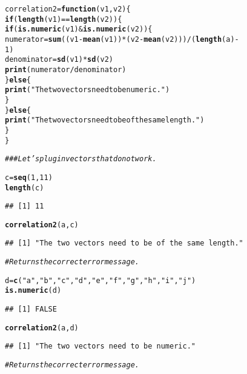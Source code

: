 \documentclass[12pt,letter]{article}\usepackage[]{graphicx}\usepackage[]{color}
\makeatletter
\newcommand{\hlnum}[1]{\textcolor[rgb]{0.686,0.059,0.569}{#1}}%
\newcommand{\hlstr}[1]{\textcolor[rgb]{0.192,0.494,0.8}{#1}}%
\newcommand{\hlcom}[1]{\textcolor[rgb]{0.678,0.584,0.686}{\textit{#1}}}%
\newcommand{\hlopt}[1]{\textcolor[rgb]{0,0,0}{#1}}%
\newcommand{\hlstd}[1]{\textcolor[rgb]{0.345,0.345,0.345}{#1}}%
\newcommand{\hlkwa}[1]{\textcolor[rgb]{0.161,0.373,0.58}{\textbf{#1}}}%
\newcommand{\hlkwb}[1]{\textcolor[rgb]{0.69,0.353,0.396}{#1}}%
\newcommand{\hlkwc}[1]{\textcolor[rgb]{0.333,0.667,0.333}{#1}}%
\newcommand{\hlkwd}[1]{\textcolor[rgb]{0.737,0.353,0.396}{\textbf{#1}}}%
\newenvironment{kframe}{%
 \def\at@end@of@kframe{}%
 \ifinner\ifhmode%
  \def\at@end@of@kframe{\end{minipage}}%
  \begin{minipage}{\columnwidth}%
 \fi\fi%
 \def\FrameCommand##1{\hskip\@totalleftmargin \hskip-\fboxsep
 \colorbox{shadecolor}{##1}\hskip-\fboxsep
     \hskip-\linewidth \hskip-\@totalleftmargin \hskip\columnwidth}%
 \MakeFramed {\advance\hsize-\width
   \@totalleftmargin\z@ \linewidth\hsize
   \@setminipage}}%
 {\par\unskip\endMakeFramed%
 \at@end@of@kframe}
\newenvironment{knitrout}{}{} %
\makeatother
\begin{document}
\begin{knitrout}
\begin{kframe}
\begin{alltt}
\hlstd{correlation2} \hlkwb{=} \hlkwa{function}\hlstd{(}\hlkwc{v1}\hlstd{,} \hlkwc{v2}\hlstd{) \{}
    \hlkwa{if} \hlstd{(}\hlkwd{length}\hlstd{(v1)} \hlopt{==} \hlkwd{length}\hlstd{(v2)) \{}
        \hlkwa{if} \hlstd{(}\hlkwd{is.numeric}\hlstd{(v1)} \hlopt{&} \hlkwd{is.numeric}\hlstd{(v2)) \{}
            \hlstd{numerator} \hlkwb{=} \hlkwd{sum}\hlstd{((v1} \hlopt{-} \hlkwd{mean}\hlstd{(v1))} \hlopt{*} \hlstd{(v2} \hlopt{-} \hlkwd{mean}\hlstd{(v2)))}\hlopt{/}\hlstd{(}\hlkwd{length}\hlstd{(a)} \hlopt{-}
                \hlnum{1}\hlstd{)}
            \hlstd{denominator} \hlkwb{=} \hlkwd{sd}\hlstd{(v1)} \hlopt{*} \hlkwd{sd}\hlstd{(v2)}
            \hlkwd{print}\hlstd{(numerator}\hlopt{/}\hlstd{denominator)}
        \hlstd{\}} \hlkwa{else} \hlstd{\{}
            \hlkwd{print}\hlstd{(}\hlstr{"The two vectors need to be numeric."}\hlstd{)}
        \hlstd{\}}
    \hlstd{\}} \hlkwa{else} \hlstd{\{}
        \hlkwd{print}\hlstd{(}\hlstr{"The two vectors need to be of the same length."}\hlstd{)}
    \hlstd{\}}
\hlstd{\}}

\hlcom{### Let's plug in vectors that do not work.}

\hlstd{c} \hlkwb{=} \hlkwd{seq}\hlstd{(}\hlnum{1}\hlstd{,} \hlnum{11}\hlstd{)}
\hlkwd{length}\hlstd{(c)}
\end{alltt}
\begin{verbatim}
## [1] 11
\end{verbatim}
\begin{alltt}
\hlkwd{correlation2}\hlstd{(a, c)}
\end{alltt}
\begin{verbatim}
## [1] "The two vectors need to be of the same length."
\end{verbatim}
\begin{alltt}
\hlcom{# Returns the correct error message.}

\hlstd{d} \hlkwb{=} \hlkwd{c}\hlstd{(}\hlstr{"a"}\hlstd{,} \hlstr{"b"}\hlstd{,} \hlstr{"c"}\hlstd{,} \hlstr{"d"}\hlstd{,} \hlstr{"e"}\hlstd{,} \hlstr{"f"}\hlstd{,} \hlstr{"g"}\hlstd{,} \hlstr{"h"}\hlstd{,} \hlstr{"i"}\hlstd{,} \hlstr{"j"}\hlstd{)}
\hlkwd{is.numeric}\hlstd{(d)}
\end{alltt}
\begin{verbatim}
## [1] FALSE
\end{verbatim}
\begin{alltt}
\hlkwd{correlation2}\hlstd{(a, d)}
\end{alltt}
\begin{verbatim}
## [1] "The two vectors need to be numeric."
\end{verbatim}
\begin{alltt}
\hlcom{# Returns the correct error message.}
\end{alltt}
\end{kframe}
\end{knitrout}
\end{document}
